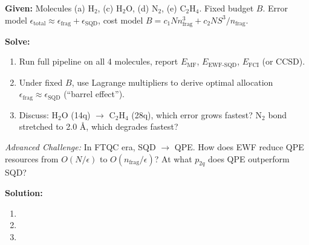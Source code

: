 \documentclass[fontset=mac]{ctexart}
\begin{document}
\begin{enumerate}
    \textbf{Given:} Molecules (a) H$_2$, (c) H$_2$O, (d) N$_2$, (e) C$_2$H$_4$. Fixed budget $B$. Error model $\epsilon_{\text{total}} \approx \epsilon_{\text{frag}} + \epsilon_{\text{SQD}}$, cost model $B = c_1 N n_{\text{frag}}^3 + c_2 N S^3 / n_{\text{frag}}$.

    \textbf{Solve:}
    \begin{enumerate}[label=(\alph*)]
        \item Run full pipeline on all 4 molecules, report $E_{\text{MF}}$, $E_{\text{EWF-SQD}}$, $E_{\text{FCI}}$ (or CCSD).
        \item Under fixed $B$, use Lagrange multipliers to derive optimal allocation $\epsilon_{\text{frag}} \approx \epsilon_{\text{SQD}}$ (``barrel effect'').
        \item Discuss: H$_2$O (14q) $\to$ C$_2$H$_4$ (28q), which error grows fastest? N$_2$ bond stretched to 2.0 \AA, which degrades fastest?
    \end{enumerate}

    \emph{Advanced Challenge:} In FTQC era, SQD $\to$ QPE. How does EWF reduce QPE resources from $O(N/\epsilon)$ to $O(n_{\text{frag}}/\epsilon)$? At what $p_{2q}$ does QPE outperform SQD?

    \textbf{Solution:}
    \begin{enumerate}[label=(\alph*)]
        \item
        \item
        \item
    \end{enumerate}

\end{enumerate}
\end{document}
